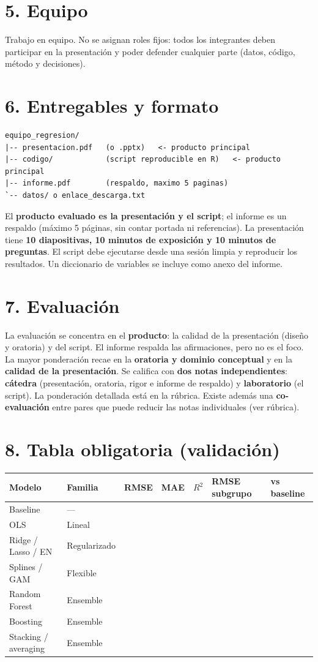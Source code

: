 \documentclass[11pt,letterpaper]{article}
\begin{document}
\section*{5. Equipo}
Trabajo en equipo. No se asignan roles fijos: todos los integrantes deben participar en la presentación y poder defender cualquier parte (datos, código, método y decisiones).

\section*{6. Entregables y formato}
\begin{verbatim}
equipo_regresion/
|-- presentacion.pdf   (o .pptx)   <- producto principal
|-- codigo/            (script reproducible en R)   <- producto principal
|-- informe.pdf        (respaldo, maximo 5 paginas)
`-- datos/ o enlace_descarga.txt
\end{verbatim}
El \textbf{producto evaluado es la presentación y el script}; el informe es un respaldo (máximo 5 páginas, sin
contar portada ni referencias). La presentación tiene \textbf{10 diapositivas, 10 minutos de exposición y 10
minutos de preguntas}. El script debe ejecutarse desde una sesión limpia y reproducir los resultados. Un
diccionario de variables se incluye como anexo del informe.

\section*{7. Evaluación}
La evaluación se concentra en el \textbf{producto}: la calidad de la presentación (diseño y oratoria) y del
script. El informe respalda las afirmaciones, pero no es el foco. La mayor ponderación recae en la
\textbf{oratoria y dominio conceptual} y en la \textbf{calidad de la presentación}. Se califica con \textbf{dos notas independientes}: \textbf{cátedra} (presentación, oratoria, rigor e informe de respaldo) y \textbf{laboratorio} (el script). La ponderación detallada está en la rúbrica. Existe además una \textbf{co-evaluación} entre pares que puede reducir las notas individuales (ver rúbrica).

\section*{8. Tabla obligatoria (validación)}
\begin{center}\small
\begin{tabular}{lllllll}
\toprule
Modelo & Familia & RMSE & MAE & $R^2$ & RMSE subgrupo & vs baseline \\
\midrule
Baseline & --- & & & & & \\
OLS & Lineal & & & & & \\
Ridge / Lasso / EN & Regularizado & & & & & \\
Splines / GAM & Flexible & & & & & \\
Random Forest & Ensemble & & & & & \\
Boosting & Ensemble & & & & & \\
Stacking / averaging & Ensemble & & & & & \\
\bottomrule
\end{tabular}\end{center}
\end{document}
